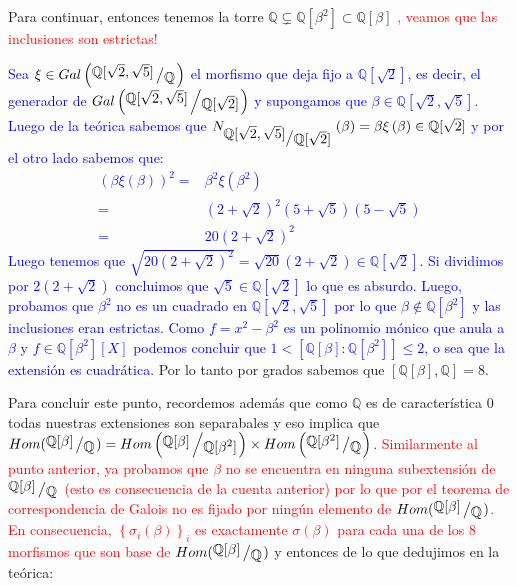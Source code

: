 \documentclass[11pt]{article}
\newcommand{\Q}{\mathbb{Q}}
\newcommand{\sett}[1]{\left\lbrace#1\right\rbrace}
\newcommand{\quotient}[2]{{\raisebox{.2em}{$#1$}\left/\raisebox{-.2em}{$#2$}\right.}}
\numberwithin{theorem}{subsection}
\begin{document}
\begin{enumerate}
\begin{itemize}
		Para continuar, entonces tenemos la torre $\Q \subsetneq \Q[\beta^2] \subset \Q[\beta]$ \textcolor{red}{, veamos que las inclusiones son estrictas!} 
		
		\textcolor{blue}{Sea $\xi \in Gal \left(\quotient{\Q[\sqrt{2}, \sqrt{5 }]}{\Q}\right) $ el morfismo que deja fijo a $\Q[\sqrt{2}]$, es decir, el generador de $Gal \left(\quotient{\Q[\sqrt{2}, \sqrt{5 }]}{\Q[\sqrt{2}]}\right)$ y supongamos que $\beta \in \Q[\sqrt{2}, \sqrt{5}]$. Luego de la te\'orica sabemos que $N_{\quotient{\Q[\sqrt{2}, \sqrt{5 }]}{\Q[\sqrt{2}]}}\left(\beta\right) = \beta \xi\left(\beta\right) \in \Q[\sqrt{2}]$ y por el otro lado sabemos que:
		\begin{equation*}
			\begin{aligned}
				\left(\beta \xi \left(\beta\right)\right)^2 = & \beta^2 \xi\left(\beta^2\right) \\
				 = & \left(2 + \sqrt{2}\right)^2 \left(5 + \sqrt{5}\right) \left(5 - \sqrt{5}\right) \\
				 = & 20\left(2 + \sqrt{2}\right)^2 
			\end{aligned}
		\end{equation*}
		Luego tenemos que $\sqrt{20\left(2 + \sqrt{2}\right)^2 } = \sqrt{20} \left(2 + \sqrt{2}\right) \in \Q[\sqrt{2}]$. Si dividimos por $2\left(2 + \sqrt{2}\right)$ concluimos que $\sqrt{5} \in \Q[\sqrt{2}]$ lo que es absurdo.
		Luego, probamos que $\beta^2$ no es un cuadrado en $\Q[\sqrt{2}, \sqrt{5}]$ por lo que $\beta \not\in \Q[\beta^2]$ y las inclusiones eran estrictas. Como $f = x^2 - \beta^2$ es un polinomio m\'onico que anula a $\beta$ y $f \in \Q[\beta^2][X]$ podemos concluir que $1 < [\Q[\beta]:\Q[\beta^2]] \leq 2$, o sea que la extensi\'on es cuadr\'atica. 
		}   Por lo tanto por grados sabemos que $[\Q[\beta], \Q] = 8$.
		
		Para concluir este punto, recordemos adem\'as que como $\Q$ es de caracter\'istica 0 todas nuestras extensiones son separabales y eso implica que $Hom(\quotient{\Q[\beta]}{\Q}) = Hom\left(\quotient{\Q[\beta]}{\Q[\beta^2]}\right) \times Hom\left(\quotient{\Q[\beta^2]}{\Q}\right)$. \textcolor{red}{Similarmente al punto anterior, ya probamos que $\beta$ no se encuentra en ninguna subextensi\'on de $\quotient{\Q[\beta]}{\Q}$ (esto es consecuencia de la cuenta anterior) por lo que por el teorema de correspondencia de Galois no es fijado por ning\'un elemento de $Hom(\quotient{\Q[\beta]}{\Q})$. En consecuencia, $\sett{\sigma_i(\beta)}_i$ es exactamente $\sigma(\beta)$ para cada una de los 8 morfismos que son base de $Hom(\quotient{\Q[\beta]}{\Q})$} y entonces de lo que dedujimos en la te\'orica:
		

\end{itemize}
\end{enumerate}
\end{document}
